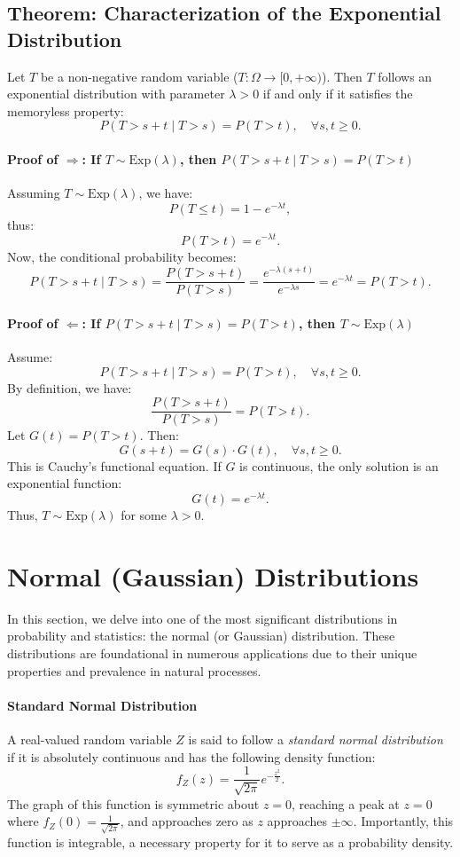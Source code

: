 \subsection{Theorem: Characterization of the Exponential Distribution}
Let \( T \) be a non-negative random variable (\( T : \Omega \to [0, +\infty) \)). Then \( T \) follows an exponential distribution with parameter \( \lambda > 0 \) if and only if it satisfies the memoryless property:
\[
P(T > s + t \mid T > s) = P(T > t), \quad \forall s, t \geq 0.
\]

\paragraph{Proof of \( \Rightarrow \): If \( T \sim \text{Exp}(\lambda) \), then \( P(T > s + t \mid T > s) = P(T > t) \)}
Assuming \( T \sim \text{Exp}(\lambda) \), we have:
\[
P(T \leq t) = 1 - e^{-\lambda t},
\]
thus:
\[
P(T > t) = e^{-\lambda t}.
\]
Now, the conditional probability becomes:
\[
P(T > s + t \mid T > s) = \frac{P(T > s + t)}{P(T > s)} = \frac{e^{-\lambda (s + t)}}{e^{-\lambda s}} = e^{-\lambda t} = P(T > t).
\]

\paragraph{Proof of \( \Leftarrow \): If \( P(T > s + t \mid T > s) = P(T > t) \), then \( T \sim \text{Exp}(\lambda) \)}
Assume:
\[
P(T > s + t \mid T > s) = P(T > t), \quad \forall s, t \geq 0.
\]
By definition, we have:
\[
\frac{P(T > s + t)}{P(T > s)} = P(T > t).
\]
Let \( G(t) = P(T > t) \). Then:
\[
G(s + t) = G(s) \cdot G(t), \quad \forall s, t \geq 0.
\]
This is Cauchy’s functional equation. If \( G \) is continuous, the only solution is an exponential function:
\[
G(t) = e^{-\lambda t}.
\]
Thus, \( T \sim \text{Exp}(\lambda) \) for some \( \lambda > 0 \).

\section{Normal (Gaussian) Distributions}
In this section, we delve into one of the most significant distributions in probability and statistics: the normal (or Gaussian) distribution. These distributions are foundational in numerous applications due to their unique properties and prevalence in natural processes.

\paragraph{Standard Normal Distribution}
A real-valued random variable \( Z \) is said to follow a \emph{standard normal distribution} if it is absolutely continuous and has the following density function:
\[
f_Z(z) = \frac{1}{\sqrt{2 \pi}} e^{-\frac{z^2}{2}}.
\]
The graph of this function is symmetric about \( z = 0 \), reaching a peak at \( z = 0 \) where \( f_Z(0) = \frac{1}{\sqrt{2 \pi}} \), and approaches zero as \( z \) approaches \( \pm \infty \). Importantly, this function is integrable, a necessary property for it to serve as a probability density.

